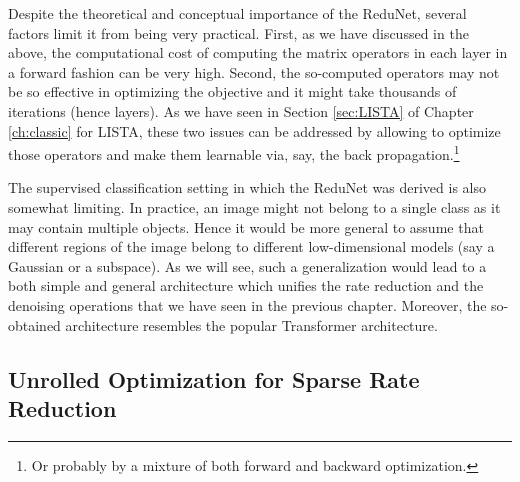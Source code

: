 \documentclass[\toplevelprefix/book-main.tex]{subfiles}
\begin{document}
Despite the theoretical and conceptual importance of the ReduNet, several factors limit it from being very practical. First, as we have discussed in the above, the computational cost of computing the matrix operators in  each layer in a forward fashion can be very high. Second, the so-computed operators may not be so effective in optimizing the objective and it might take thousands of iterations (hence layers). As we have seen  in Section \ref{sec:LISTA} of Chapter \ref{ch:classic} for LISTA, these two issues can be addressed by allowing to optimize those operators and make them learnable via, say, the back propagation.\footnote{Or probably by a mixture of both forward and backward optimization.}

The supervised classification setting in which the ReduNet was derived is also somewhat limiting. In practice, an image might not belong to a single class as it may contain multiple objects. Hence it would be more general to assume that different regions of the image belong to  different low-dimensional models (say a Gaussian or a subspace). As we will see, such a generalization would lead to a both simple and general architecture which unifies the rate reduction and the denoising operations that we have seen in the previous chapter. Moreover, the so-obtained architecture resembles the popular Transformer architecture.



\subsection{Unrolled Optimization for Sparse Rate Reduction}

\end{document}
